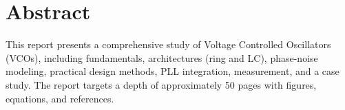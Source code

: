 \chapter*{Abstract}
This report presents a comprehensive study of Voltage Controlled Oscillators (VCOs), including fundamentals, architectures (ring and LC), phase-noise modeling, practical design methods, PLL integration, measurement, and a case study. The report targets a depth of approximately 50 pages with figures, equations, and references.


